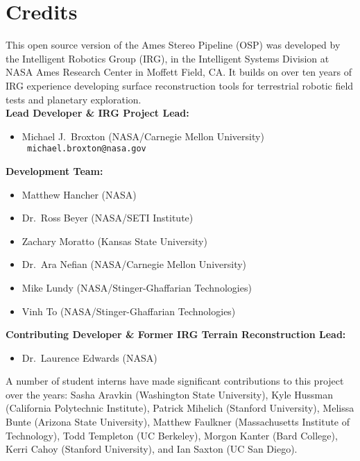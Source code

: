 
\chapter*{Credits}

This open source version of the Ames Stereo Pipeline (OSP) was
developed by the Intelligent Robotics Group (IRG), in the Intelligent
Systems Division at NASA Ames Research Center in Moffett Field, CA. It
builds on over ten years of IRG experience developing surface
reconstruction tools for terrestrial robotic field tests and planetary
exploration. \\

{\bf Lead Developer \& IRG Project Lead:}
\begin {itemize} 
\item Michael J.~Broxton (NASA/Carnegie Mellon University)\\ {\tt
  michael.broxton@nasa.gov}\\
\end{itemize}

{\bf Development Team:}
\begin{itemize}
\item Matthew Hancher (NASA)
\item Dr.~Ross Beyer (NASA/SETI Institute)
\item Zachary Moratto (Kansas State University)
\item Dr.~Ara Nefian (NASA/Carnegie Mellon University)
\item Mike Lundy (NASA/Stinger-Ghaffarian Technologies)\\
\item Vinh To (NASA/Stinger-Ghaffarian Technologies)
\end{itemize}

{\bf Contributing Developer \& Former IRG Terrain Reconstruction Lead:}
\begin{itemize}
\item Dr.\ Laurence Edwards (NASA)
\end{itemize}

A number of student interns have made significant contributions to
this project over the years: Sasha Aravkin (Washington State
University), Kyle Hussman (California Polytechnic Institute), Patrick
Mihelich (Stanford University), Melissa Bunte (Arizona State
University), Matthew Faulkner (Massachusetts Institute of Technology),
Todd Templeton (UC Berkeley), Morgon Kanter (Bard College), Kerri
Cahoy (Stanford University), and Ian Saxton (UC San Diego).

